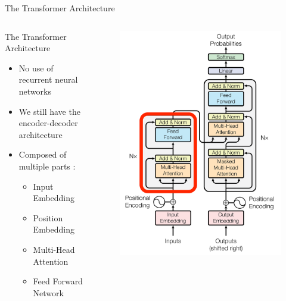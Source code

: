\documentclass[aspectratio=169]{beamer}
\begin{document}
\begin{frame}{The Transformer Architecture}
\begin{columns}
\begin{column}{0.5\textwidth}
\centering

   The Transformer Architecture \cite{vaswani2017attention}
 \vspace{.5cm}
 
 \raggedright
   \begin{itemize}
   	\item No use of recurrent neural networks
	\item We still have the encoder-decoder architecture
	\item Composed of multiple parts :
	\begin{itemize}
		\item Input Embedding
		\item Position Embedding
		\item Multi-Head Attention
		\item Feed Forward Network
	\end{itemize}
   \end{itemize}
\end{column}
\begin{column}{0.5\textwidth}  %
    \begin{center}
    \vspace{-1.3cm}
    \begin{figure}
    \begin{overprint}
    	 \includegraphics[height=\paperheight]{figures/transformer_encoder_block}

\end{overprint}
\end{figure}
\end{center}
\end{column}
\end{columns}
\end{frame}
\end{document}
